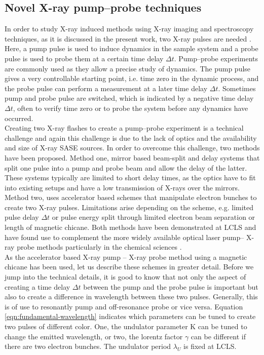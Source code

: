 \subsection{Novel X-ray pump–probe techniques}
In order to study X-ray induced methods using X-ray imaging and spectroscopy techniques, as it is discussed in the present work, two X-ray pulses are needed . Here, a pump pulse is used to induce dynamics in the sample system and a probe pulse is used to probe them at a certain time delay $\Delta t$. Pump--probe experiments are commonly used as they allow a precise study of dynamics. The pump pulse gives a very controllable starting point, i.e. time zero in the dynamic process, and the probe pulse can perform a measurement at a later time delay $\Delta t$. Sometimes pump and probe pulse are switched, which is indicated by a negative time delay $\Delta t$, often to verify time zero or to probe the system before any dynamics have occurred.\\
Creating two X-ray flashes to create a pump--probe experiment is a technical challenge and again this challenge is due to the lack of optics and the availability and size of X-ray SASE sources. In order to overcome this challenge, two methods have been proposed. Method one, mirror based beam-split and delay systems \cite{Castagna-2013-JPCS,Murphy-2012-SPIE} that split one pulse into a pump and probe beam and allow the delay of the latter. These systems typically are limited to short delay times, as the optics have to fit into existing setups and have a low transmission of X-rays over the mirrors. Method two, uses accelerator based schemes \cite{Lutman-2013-PRL,Marinelli-2015-NatComm} that manipulate electron bunches to create two X-ray pulses. Limitations arise depending on the scheme, e.g. limited pulse delay $\Delta t$ or pulse energy split through limited electron beam separation or length of magnetic chicane. Both methods have been demonstrated at LCLS and have found use to complement the more widely available optical laser pump-- X-ray probe methods particularly in the chemical sciences \cite{Picon-2016-NatComm,Ferguson-2016-SciAdv,Liekhus-Schmaltz-2015-NatComm}.\\
As the accelerator based X-ray pump -- X-ray probe method using a magnetic chicane has been used, let us describe these schemes in greater detail. Before we jump into the technical details, it is good to know that not only the aspect of creating a time delay $\Delta t$ between the pump and the probe pulse is important but also to create a difference in wavelength between these two pulses. Generally, this is of use to resonantly pump and off-resonance probe or vice versa. Equation \eqref{eqn:fundamental-wavelength} indicates which parameters can be tuned to create two pulses of different color. One, the undulator parameter K can be tuned to change the emitted wavelength, or two, the lorentz factor $\gamma$ can be different if there are two electron bunches. The undulator period $\lambda_{U}$ is fixed at LCLS.
